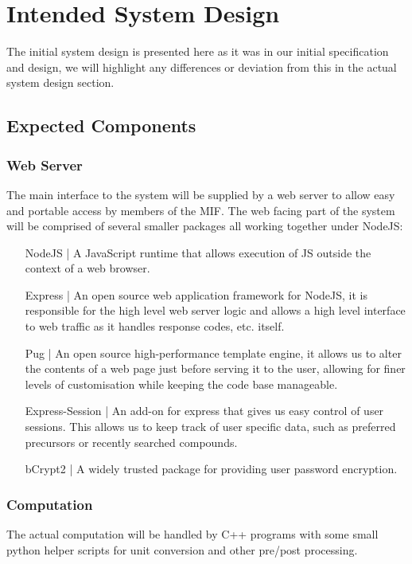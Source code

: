 \section{Intended System Design}
The initial system design is presented here as it was in our initial specification and design, we will highlight any differences or deviation from this in the actual system design section.
\subsection{Expected Components}
\subsubsection{Web Server}
The main interface to the system will be supplied by a web server to allow easy and portable access by members of the MIF. The web facing part of the system will be comprised of several smaller packages all working together under NodeJS:

\begin{enumerate}[label = {}, leftmargin=\widthof{Express |}+\labelsep]
	\item[NodeJS |] A JavaScript runtime that allows execution of JS outside the context of a web browser. 
	
	\item[Express |] An open source web application framework for NodeJS, it is responsible for the high level web server logic and allows a high level interface to web traffic as it handles response codes, etc. itself.
\end{enumerate}
\begin{enumerate}[label = {}, leftmargin=\widthof{Express-Session |}+\labelsep]
	\item[Pug |] An open source high-performance template engine, it allows us to alter the contents of a web page just before serving it to the user, allowing for finer levels of customisation while keeping the code base manageable.
			
	\item[Express-Session |] An add-on for express that gives us easy control of user sessions. This allows us to keep track of user specific data, such as preferred precursors or recently searched compounds.
	
	\item[bCrypt2 |] A widely trusted package for providing user password encryption.
\end{enumerate}

\subsubsection{Computation}
The actual computation will be handled by C++ programs with some small python helper scripts for unit conversion and other pre/post processing. \\

